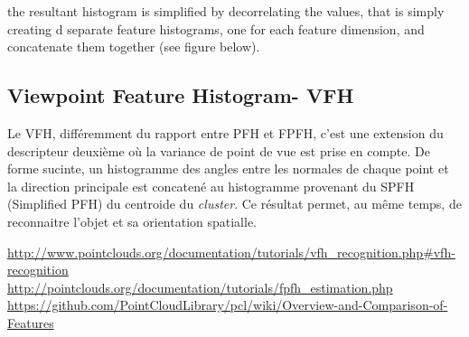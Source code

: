 the resultant histogram is simplified by decorrelating the values, that is simply creating d separate feature histograms, one for each feature dimension, and concatenate them together (see figure below).

\subsection{Viewpoint Feature Histogram- VFH}

Le VFH, différemment du rapport entre PFH et FPFH, c'est une extension du descripteur deuxième où la variance de point de vue est prise en compte. De forme sucinte, un histogramme des angles entre les normales de chaque point et la direction principale est concatené au histogramme provenant du SPFH (Simplified PFH) du centroide du \textit{cluster}. Ce résultat permet, au même temps, de reconnaitre l'objet et sa orientation spatialle. 


\url{http://www.pointclouds.org/documentation/tutorials/vfh_recognition.php#vfh-recognition} \\

\url{http://pointclouds.org/documentation/tutorials/fpfh_estimation.php} \\

\url{https://github.com/PointCloudLibrary/pcl/wiki/Overview-and-Comparison-of-Features} \\
